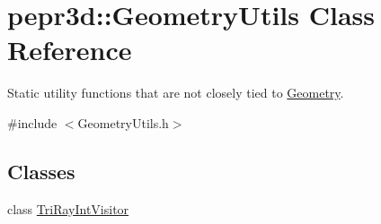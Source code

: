 \hypertarget{classpepr3d_1_1_geometry_utils}{}\section{pepr3d\+::Geometry\+Utils Class Reference}
\label{classpepr3d_1_1_geometry_utils}


Static utility functions that are not closely tied to \mbox{\hyperlink{classpepr3d_1_1_geometry}{Geometry}}.  




{\ttfamily \#include $<$Geometry\+Utils.\+h$>$}

\subsection*{Classes}
\begin{DoxyCompactItemize}
\item 
class \mbox{\hyperlink{classpepr3d_1_1_geometry_utils_1_1_tri_ray_int_visitor}{Tri\+Ray\+Int\+Visitor}}
\end{DoxyCompactItemize}
